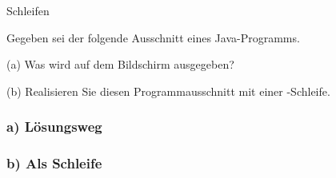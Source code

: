 \begin{frame}[t]%

\begin{exercise}{Schleifen}
\begin{body}
Gegeben sei der folgende Ausschnitt eines Java-Programms.



\begin{parts}
\item[(a)] Was wird auf dem Bildschirm ausgegeben?
\item[(b)] Realisieren Sie diesen Programmausschnitt mit einer -Schleife.
\end{parts}
\end{body}
\end{exercise}
\end{frame}


\begin{frame}[fragile]%
 \frametitle{a) L\"osungsweg}%

\end{frame}


\begin{frame}[fragile]%
 \frametitle{b) Als  Schleife}%

\end{frame}
